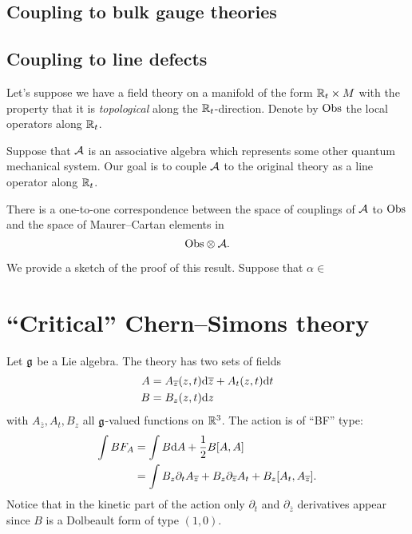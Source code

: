 \documentclass[11pt]{amsart}
\def\zbar{{\overline{z}}}
\begin{document}
\subsection*{Coupling to bulk gauge theories}

\subsection{Coupling to line defects} 

Let's suppose we have a field theory on a manifold of the form $\mathbb R_t \times M$ with the property that it is {\em topological} along the $\mathbb R_t$-direction. 
Denote by ${\rm Obs}$ the local operators along $\mathbb R_t$. 

Suppose that $\mathcal A$ is an associative algebra which represents some other quantum mechanical system. 
Our goal is to couple $\mathcal A$ to the original theory as a line operator along $\mathbb R_t$. 

\begin{prop}\label{prop:line}
There is a one-to-one correspondence between the space of couplings of $\mathcal A$ to ${\rm Obs}$ and the space of Maurer--Cartan elements in 
\[
{\rm Obs} \otimes \mathcal A .
\]
\end{prop}

We provide a sketch of the proof of this result. 
Suppose that $\alpha \in $



\section{``Critical'' Chern--Simons theory}

Let $\mathfrak g$ be a Lie algebra. 
The theory has two sets of fields
\begin{align*}
A & = A_{\zbar} (z,t) \d \zbar + A_{t} (z, t) \d t \\
B & = B_z (z,t) \d z 
\end{align*}
with $A_{\zbar}, A_t, B_z$ all $\mathfrak g$-valued functions on $\mathbb R^3$.
The action is of ``BF'' type:
\begin{align*}
\int B F_A & = \int B \d A + \frac12 B [A,A] \\
& = \int B_z \partial_t A_{\zbar} + B_z \partial_{\zbar} A_t + B_z [A_t, A_\zbar] .
\end{align*}
Notice that in the kinetic part of the action only $\partial_t$ and $\partial_{\zbar}$ derivatives appear since $B$ is a Dolbeault form of type $(1,0)$. 
\end{document}

